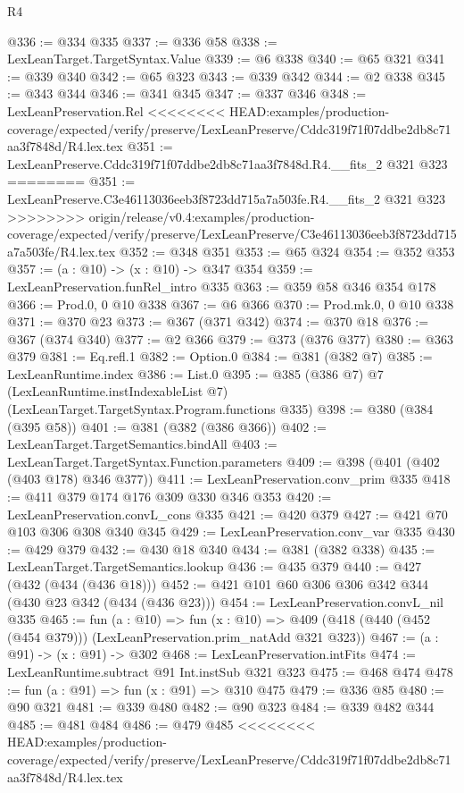 \begin{lexlean}{R4}
\begin{coremodule}
{{{{{{{{{{{{{{{{{{{{@336 := @334 @335
@337 := @336 @58
@338 := LexLeanTarget.TargetSyntax.Value
@339 := @6 @338
@340 := @65 @321
@341 := @339 @340
@342 := @65 @323
@343 := @339 @342
@344 := @2 @338
@345 := @343 @344
@346 := @341 @345
@347 := @337 @346
@348 := LexLeanPreservation.Rel
<<<<<<<< HEAD:examples/production-coverage/expected/verify/preserve/LexLeanPreserve/Cddc319f71f07ddbe2db8c71aa3f7848d/R4.lex.tex
@351 := LexLeanPreserve.Cddc319f71f07ddbe2db8c71aa3f7848d.R4.__fits_2 @321 @323
========
@351 := LexLeanPreserve.C3e46113036eeb3f8723dd715a7a503fe.R4.__fits_2 @321 @323
>>>>>>>> origin/release/v0.4:examples/production-coverage/expected/verify/preserve/LexLeanPreserve/C3e46113036eeb3f8723dd715a7a503fe/R4.lex.tex
@352 := @348 @351
@353 := @65 @324
@354 := @352 @353
@357 := (a : @10) -> (x : @10) -> @347 @354
@359 := LexLeanPreservation.funRel_intro @335
@363 := @359 @58 @346 @354 @178
@366 := Prod.{0, 0} @10 @338
@367 := @6 @366
@370 := Prod.mk.{0, 0} @10 @338
@371 := @370 @23
@373 := @367 (@371 @342)
@374 := @370 @18
@376 := @367 (@374 @340)
@377 := @2 @366
@379 := @373 (@376 @377)
@380 := @363 @379
@381 := Eq.refl.{1}
@382 := Option.{0}
@384 := @381 (@382 @7)
@385 := LexLeanRuntime.index
@386 := List.{0}
@395 := @385
    (@386 @7)
    @7
    (LexLeanRuntime.instIndexableList @7)
    (LexLeanTarget.TargetSyntax.Program.functions @335)
@398 := @380 (@384 (@395 @58))
@401 := @381 (@382 (@386 @366))
@402 := LexLeanTarget.TargetSemantics.bindAll
@403 := LexLeanTarget.TargetSyntax.Function.parameters
@409 := @398 (@401 (@402 (@403 @178) @346 @377))
@411 := LexLeanPreservation.conv_prim @335
@418 := @411 @379 @174 @176 @309 @330 @346 @353
@420 := LexLeanPreservation.convL_cons @335
@421 := @420 @379
@427 := @421 @70 @103 @306 @308 @340 @345
@429 := LexLeanPreservation.conv_var @335
@430 := @429 @379
@432 := @430 @18 @340
@434 := @381 (@382 @338)
@435 := LexLeanTarget.TargetSemantics.lookup
@436 := @435 @379
@440 := @427 (@432 (@434 (@436 @18)))
@452 := @421 @101 @60 @306 @306 @342 @344 (@430 @23 @342 (@434 (@436 @23)))
@454 := LexLeanPreservation.convL_nil @335
@465 := fun (a : @10) =>
  fun (x : @10) => @409 (@418 (@440 (@452 (@454 @379))) (LexLeanPreservation.prim_natAdd @321 @323))
@467 := (a : @91) -> (x : @91) -> @302
@468 := LexLeanPreservation.intFits
@474 := LexLeanRuntime.subtract @91 Int.instSub @321 @323
@475 := @468 @474
@478 := fun (a : @91) => fun (x : @91) => @310 @475
@479 := @336 @85
@480 := @90 @321
@481 := @339 @480
@482 := @90 @323
@484 := @339 @482 @344
@485 := @481 @484
@486 := @479 @485
<<<<<<<< HEAD:examples/production-coverage/expected/verify/preserve/LexLeanPreserve/Cddc319f71f07ddbe2db8c71aa3f7848d/R4.lex.tex
}}}}}}}}}}}}}}}}}}}}
\end{coremodule}
\end{lexlean}
